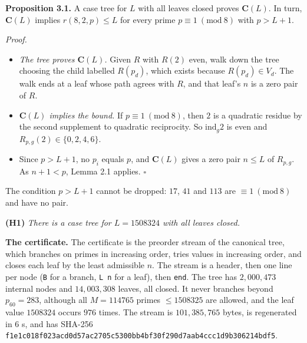 \documentclass[
]{amsart}
\providecommand{\tightlist}{%
  \setlength{\itemsep}{0pt}\setlength{\parskip}{0pt}}
\begin{document}
\textbf{Proposition 3.1.} A case tree for \(L\) with all leaves closed
proves \(\mathbf{C}(L)\). In turn, \(\mathbf{C}(L)\) implies
\(r(8,2,p)\le L\) for every prime \(p\equiv1\ (\mathrm{mod}\ 8)\) with
\(p>L+1\).

\emph{Proof.}

\begin{itemize}
\tightlist
\item
  \emph{The tree proves \(\mathbf{C}(L)\).} Given \(R\) with \(R(2)\)
  even, walk down the tree choosing the child labelled \(R(p_d)\), which
  exists because \(R(p_d)\in V_d\). The walk ends at a leaf whose path
  agrees with \(R\), and that leaf's \(n\) is a zero pair of \(R\).
\item
  \emph{\(\mathbf{C}(L)\) implies the bound.} If
  \(p\equiv1\ (\mathrm{mod}\ 8)\), then \(2\) is a quadratic residue by
  the second supplement to quadratic reciprocity. So \(\mathrm{ind}_g2\)
  is even and \(R_{p,g}(2)\in\{0,2,4,6\}\).
\item
  Since \(p>L+1\), no \(p_i\) equals \(p\), and \(\mathbf{C}(L)\) gives
  a zero pair \(n\le L\) of \(R_{p,g}\). As \(n+1<p\), Lemma 2.1
  applies. \(\square\)
\end{itemize}

The condition \(p>L+1\) cannot be dropped: \(17\), \(41\) and \(113\)
are \(\equiv1\ (\mathrm{mod}\ 8)\) and have no pair.

\textbf{(H1)} \emph{There is a case tree for \(L=1508324\) with all
leaves closed.}

\textbf{The certificate.} The certificate is the preorder stream of the
canonical tree, which branches on primes in increasing order, tries
values in increasing order, and closes each leaf by the least admissible
\(n\). The stream is a header, then one line per node (\texttt{B} for a
branch, \texttt{L\ n} for a leaf), then \texttt{end}. The tree has
\(2{,}000{,}473\) internal nodes and \(14{,}003{,}308\) leaves, all
closed. It never branches beyond \(p_{60}=283\), although all
\(M=114765\) primes \(\le1508325\) are allowed, and the leaf value
\(1508324\) occurs \(976\) times. The stream is \(101{,}385{,}765\)
bytes, is regenerated in \(6\) s, and has SHA-256
\texttt{f1e1c018f023acd0d57ac2705c5300bb4bf30f290d7aab4ccc1d9b306214bdf5}.
\end{document}

